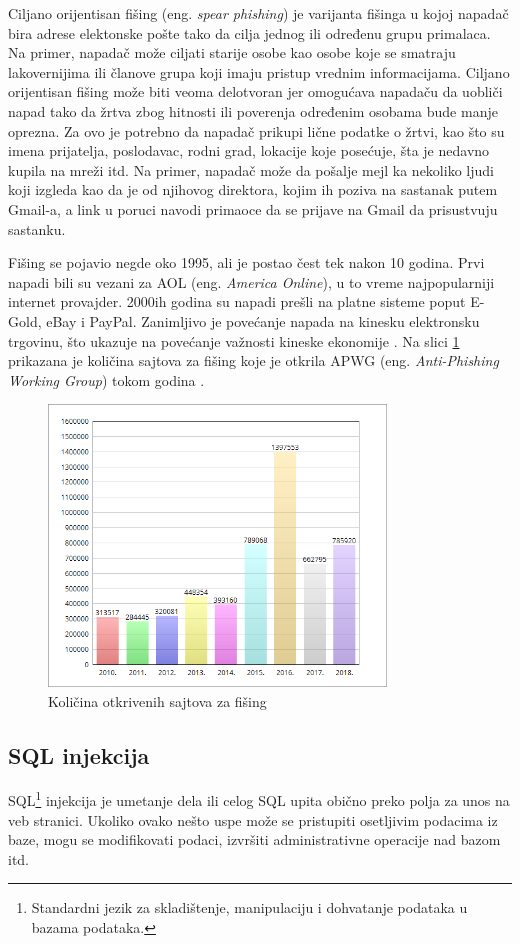 \documentclass[a4paper]{article}
\theoremstyle{break}
\begin{document}
{Ciljano orijentisan fišing (eng. {\em spear phishing}) je varijanta fišinga u kojoj napadač bira adrese elektonske pošte tako da cilja jednog ili određenu grupu primalaca. Na primer, napadač može ciljati starije osobe kao osobe koje se smatraju lakovernijima ili članove grupa koji imaju pristup vrednim informacijama. Ciljano orijentisan fišing može biti veoma delotvoran jer omogućava napadaču da uobliči napad tako da žrtva zbog hitnosti ili poverenja određenim osobama bude manje oprezna. Za ovo je potrebno da napadač prikupi lične podatke o žrtvi, kao što su imena prijatelja, poslodavac, rodni grad, lokacije koje posećuje, šta je nedavno kupila na mreži itd.
Na primer, napadač može da pošalje mejl ka nekoliko ljudi koji izgleda kao da je od njihovog direktora, kojim ih poziva na sastanak putem Gmail-a, a link u poruci navodi primaoce da se prijave na Gmail da prisustvuju sastanku. 

Fišing se pojavio negde oko 1995, ali je postao čest tek nakon 10 godina. Prvi napadi bili su vezani za AOL (eng. {\em America Online}), u to vreme najpopularniji internet provajder\cite {phishing_aol}. 2000ih godina su napadi prešli na platne sisteme poput E-Gold, eBay i PayPal.
Zanimljivo je povećanje napada na kinesku elektronsku trgovinu, što ukazuje na povećanje važnosti kineske ekonomije \cite{knjiga}.
Na slici \ref{fig:phishing_napadi} prikazana je količina sajtova za fišing koje je otkrila APWG (eng. {\em Anti-Phishing Working Group}) tokom godina \cite{apwg}.

\begin{figure}[h!]
\begin{center}
\includegraphics[height=0.3\textwidth, width=0.8\textwidth]{phishing.png}
\end{center}
\caption{Količina otkrivenih sajtova za fišing}
\label{fig:phishing_napadi}
\end{figure}
\subsection{SQL injekcija}
\label{subsec:sql}

SQL\footnote{Standardni jezik za skladištenje, manipulaciju i dohvatanje podataka u bazama podataka.} injekcija je umetanje dela ili celog SQL upita obično preko polja za unos na veb stranici. Ukoliko ovako nešto uspe može se pristupiti osetljivim podacima iz baze, mogu se modifikovati podaci, izvršiti administrativne operacije nad bazom itd. 

}
\end{document}
